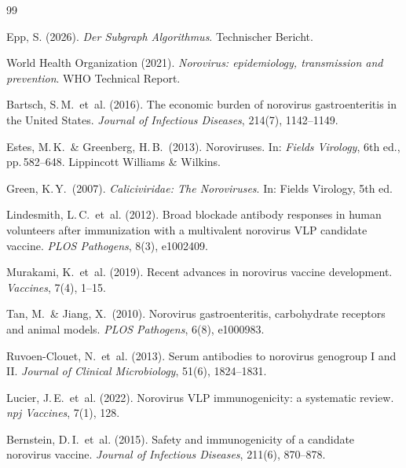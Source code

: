 ﻿\documentclass[a4paper,12pt]{article}
\theoremstyle{plain}
\theoremstyle{definition}
\theoremstyle{remark}
\begin{document}

\begin{thebibliography}{99}

Epp, S. (2026). \emph{Der Subgraph Algorithmus}.
Technischer Bericht.

World Health Organization (2021).
\emph{Norovirus: epidemiology, transmission and prevention}.
WHO Technical Report.

Bartsch, S.\,M.\ et~al. (2016).
The economic burden of norovirus gastroenteritis in the United States.
\emph{Journal of Infectious Diseases}, 214(7), 1142--1149.

Estes, M.\,K.\ \& Greenberg, H.\,B.\ (2013).
Noroviruses.
In: \emph{Fields Virology}, 6th ed., pp.\,582--648.
Lippincott Williams \& Wilkins.

Green, K.\,Y.\ (2007).
\emph{Caliciviridae: The Noroviruses}.
In: Fields Virology, 5th ed.

Lindesmith, L.\,C.\ et~al. (2012).
Broad blockade antibody responses in human volunteers after immunization
with a multivalent norovirus VLP candidate vaccine.
\emph{PLOS Pathogens}, 8(3), e1002409.

Murakami, K.\ et~al. (2019).
Recent advances in norovirus vaccine development.
\emph{Vaccines}, 7(4), 1--15.

Tan, M.\ \& Jiang, X.\ (2010).
Norovirus gastroenteritis, carbohydrate receptors and animal models.
\emph{PLOS Pathogens}, 6(8), e1000983.

Ruvoen-Clouet, N.\ et~al. (2013).
Serum antibodies to norovirus genogroup I and II.
\emph{Journal of Clinical Microbiology}, 51(6), 1824--1831.

Lucier, J.\,E.\ et~al. (2022).
Norovirus VLP immunogenicity: a systematic review.
\emph{npj Vaccines}, 7(1), 128.

Bernstein, D.\,I.\ et~al. (2015).
Safety and immunogenicity of a candidate norovirus vaccine.
\emph{Journal of Infectious Diseases}, 211(6), 870--878.


\end{thebibliography}
\end{document}
